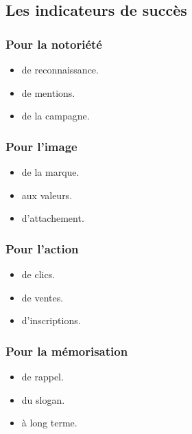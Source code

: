 \subsection{Les indicateurs de succès}

\subsubsection{Pour la notoriété}

\begin{itemize}
    \item {} de reconnaissance.
    \item {} de mentions.
    \item {} de la campagne.
\end{itemize}

\subsubsection{Pour l'image}

\begin{itemize}
    \item {} de la marque.
    \item {} aux valeurs.
    \item {} d'attachement.
\end{itemize}

\subsubsection{Pour l'action}

\begin{itemize}
    \item {} de clics.
    \item {} de ventes.
    \item {} d'inscriptions.
\end{itemize}

\subsubsection{Pour la mémorisation}

\begin{itemize}
    \item {} de rappel.
    \item {} du slogan.
    \item {} à long terme.
\end{itemize}

